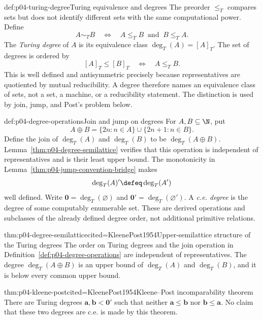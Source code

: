 \begin{hbdefinition}{def:p04-turing-degree}{Turing equivalence and degrees}
The preorder \(\leq_T\) compares sets but does not identify different sets
with the same computational power.  Define
\[
 A\sim_TB\quad\Leftrightarrow\quad
 A\leq_TB\ \text{ and }\ B\leq_TA.
\]
The \emph{Turing degree} of \(A\) is its equivalence class
\(\deg_T(A)=[A]_T\).  The set of degrees is ordered by
\[
 [A]_T\leq[B]_T\quad\Leftrightarrow\quad A\leq_TB.
\]
This is well defined and antisymmetric precisely because representatives are
quotiented by mutual reducibility.  A degree therefore names an equivalence
class of sets, not a set, a machine, or a reducibility statement.  The
distinction is used by join, jump, and Post's problem below.
\end{hbdefinition}

\begin{hbdefinition}{def:p04-degree-operations}{Join and jump on degrees}
For \(A,B\subseteq\N\), put
\[
 A\oplus B=\{2n:n\in A\}\cup\{2n+1:n\in B\}.
\]
Define the join of \(\deg_T(A)\) and \(\deg_T(B)\) to be
\(\deg_T(A\oplus B)\).  Lemma~\ref{thm:p04-degree-semilattice} verifies that
this operation is independent of representatives and is their least upper
bound.  The monotonicity in
Lemma~\ref{thm:p04-jump-convention-bridge} makes
\[
 \deg_T(A)'\defeq\deg_T(A')
\]
well defined.  Write \(\mathbf0=\deg_T(\varnothing)\) and
\(\mathbf0'=\deg_T(\varnothing')\).  A \emph{c.e. degree} is the degree of
some computably enumerable set.  These are derived operations and subclasses
of the already defined degree order, not additional primitive relations.
\end{hbdefinition}

\begin{hblemma}{thm:p04-degree-semilattice}{cited=KleenePost1954}{Upper-semilattice structure of the Turing degrees}
The order on Turing degrees and the join operation in
Definition~\ref{def:p04-degree-operations} are independent of representatives.
The degree \(\deg_T(A\oplus B)\) is an upper bound of
\(\deg_T(A)\) and \(\deg_T(B)\), and it is below every common upper bound.
\end{hblemma}

\begin{hbtheorem}{thm:p04-kleene-post}{cited=KleenePost1954}{Kleene--Post incomparability theorem}
There are Turing degrees \(\mathbf a,\mathbf b<\mathbf0'\) such that neither
\(\mathbf a\leq\mathbf b\) nor \(\mathbf b\leq\mathbf a\).  No claim that
these two degrees are c.e. is made by this theorem.
\end{hbtheorem}


